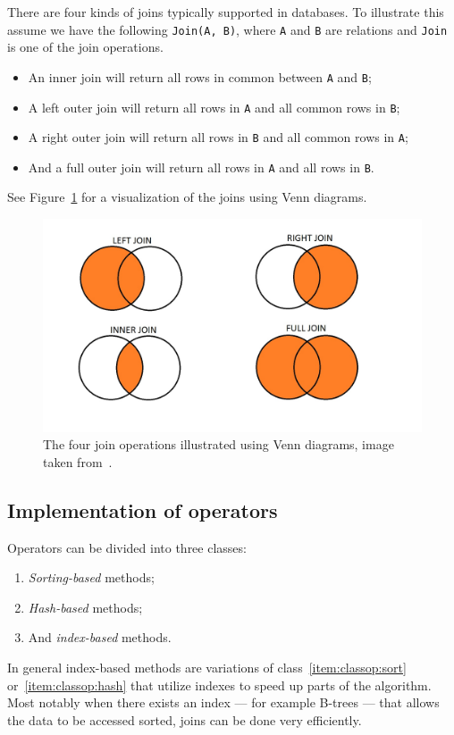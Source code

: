 There are four kinds of joins typically supported in databases. To illustrate
this assume we have the following \texttt{Join(A, B)}, where \texttt{A} and
\texttt{B} are relations and \texttt{Join} is one of the join operations.
\begin{itemize}
\item An inner join will return all rows in common between \texttt{A} and
  \texttt{B};
\item A left outer join will return all rows in \texttt{A} and all common rows
  in \texttt{B};
\item A right outer join will return all rows in \texttt{B} and all common rows
  in \texttt{A};
\item And a full outer join will return all rows in \texttt{A} and all rows in
  \texttt{B}.
\end{itemize}
See Figure~\ref{fig:vennjoin} for a visualization of the joins using Venn
diagrams.

\begin{figure}[ht]
  \includegraphics[scale=0.4]{Images/SQL-Join-Venn-Diagrams.jpg}
  \caption[Illustration of join operations using Venn diagrams]{The four join
    operations illustrated using Venn diagrams, image taken
    from~\cite{brian_2014_better_bqj}.}\label{fig:vennjoin}
\end{figure}

\subsection{Implementation of operators}\label{sec:opimpl}

Operators can be divided into three classes:
\begin{enumerate}
\item\label{item:classop:sort} \textit{Sorting-based} methods;
\item\label{item:classop:hash} \textit{Hash-based} methods;
\item\label{item:classop:index} And \textit{index-based} methods.
\end{enumerate}
In general index-based methods are variations of class~\ref{item:classop:sort}
or~\ref{item:classop:hash} that utilize indexes to speed up parts of the
algorithm. Most notably when there exists an index --- for example B-trees ---
that allows the data to be accessed sorted, joins can be done very efficiently.

